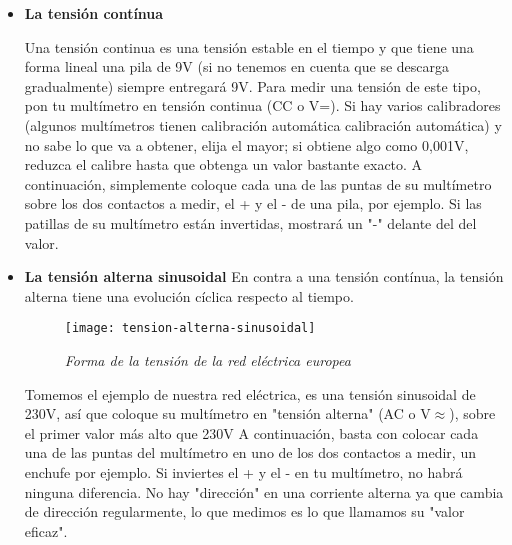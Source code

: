 \begin{itemize}
\item \textbf{La tensión contínua}

\begin{normalize}
Una tensión continua es una tensión estable en el tiempo y que tiene una forma lineal
una pila de 9V (si no tenemos en cuenta que se descarga gradualmente) siempre entregará 9V. 
Para medir una tensión de este tipo, pon tu multímetro en tensión continua
(CC o V=). Si hay varios calibradores (algunos multímetros tienen calibración automática
calibración automática) y no sabe lo que va a obtener, elija el mayor; si obtiene algo como 0,001V, reduzca el calibre hasta que obtenga un valor bastante exacto.
A continuación, simplemente coloque cada una de las puntas de su multímetro sobre los dos contactos a medir, el + y el - de una pila, por ejemplo.
Si las patillas de su multímetro están invertidas, mostrará un "-" delante del
del valor.
\end{normalize}

\newpage


\item \textbf{La tensión alterna sinusoidal}
En contra a una tensión contínua, la tensión alterna tiene una evolución cíclica respecto al tiempo.

\begin{figure}[h]
\texttt{[image: tension-alterna-sinusoidal]} 
\centering
\caption*{\textit{Forma de la tensión de la red eléctrica europea}}
\end{figure}
Tomemos el ejemplo de nuestra red eléctrica, es una tensión sinusoidal de 230V, así que coloque su multímetro en "tensión alterna" (AC o V$\approx$), sobre el primer valor más alto que 230V
A continuación, basta con colocar cada una de las puntas del multímetro en uno de los dos contactos a medir, un enchufe por ejemplo. Si inviertes el + y el - en tu multímetro, no habrá ninguna diferencia. No hay "dirección" en una corriente alterna ya que cambia de dirección regularmente, lo que medimos es lo que llamamos su "valor eficaz".

\noindent{}\\


\noindent{}\\
\end{itemize}
\newpage


